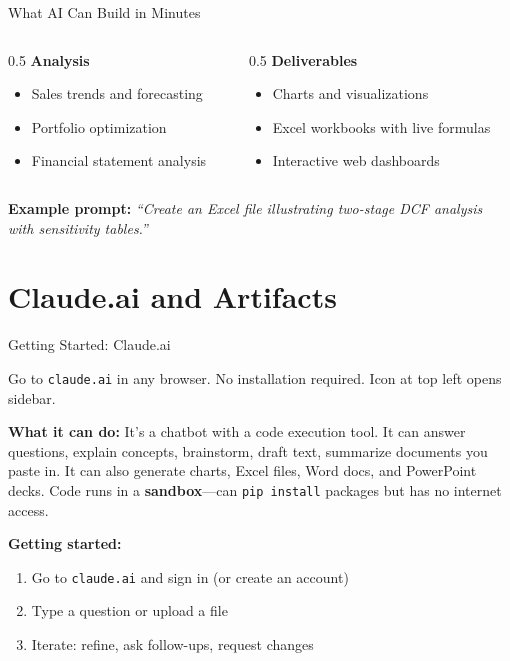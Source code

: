 \documentclass[aspectratio=169]{beamer}
\begin{document}
\begin{frame}{What AI Can Build in Minutes}
\begin{columns}[T]
\begin{column}{0.5\textwidth}
\textbf{Analysis}
\begin{itemize}\small
  \item Sales trends and forecasting
  \item Portfolio optimization
  \item Financial statement analysis
\end{itemize}
\end{column}
\begin{column}{0.5\textwidth}
\textbf{Deliverables}
\begin{itemize}\small
  \item Charts and visualizations
  \item Excel workbooks with live formulas
  \item Interactive web dashboards
\end{itemize}
\end{column}
\end{columns}

\vspace{0.8cm}
\begin{center}
\textbf{Example prompt:} \textit{``Create an Excel file illustrating two-stage DCF analysis with sensitivity tables.''}
\end{center}
\end{frame}

\section{Claude.ai and Artifacts}

\begin{frame}{Getting Started: Claude.ai}

Go to \texttt{claude.ai} in any browser. No installation required.  Icon at top left opens sidebar.

\textbf{What it can do:}
It's a chatbot with a code execution tool.  It can answer questions, explain concepts, brainstorm, draft text, summarize documents you paste in.  It can also generate charts, Excel files, Word docs, and PowerPoint decks.  Code runs in a \textbf{sandbox}---can \texttt{pip install} packages but has \alert{no internet access}.

\textbf{Getting started:}
\begin{enumerate}\small
  \item Go to \texttt{claude.ai} and sign in (or create an account)
  \item Type a question or upload a file
  \item Iterate: refine, ask follow-ups, request changes
\end{enumerate}
\end{frame}
\end{document}
